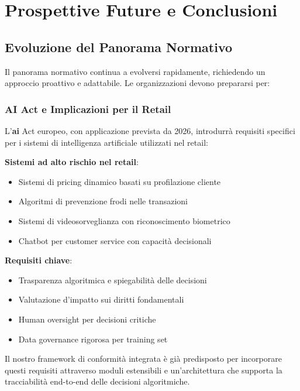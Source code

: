 \section{\texorpdfstring{Prospettive Future e Conclusioni}{4.9 - Prospettive Future e Conclusioni}}
\label{sec:4.9_conclusioni}

\subsection{\texorpdfstring{Evoluzione del Panorama Normativo}{4.9.1 - Evoluzione del Panorama Normativo}}
\label{subsec:4.9.1_evoluzione}

Il panorama normativo continua a evolversi rapidamente, richiedendo un approccio proattivo e adattabile. Le organizzazioni devono prepararsi per:

\subsubsection{\texorpdfstring{AI Act e Implicazioni per il Retail}{4.9.1.1 - AI Act e Implicazioni per il Retail}}

L'\textbf{\gls{ai}} Act europeo, con applicazione prevista da 2026, introdurrà requisiti specifici per i sistemi di intelligenza artificiale utilizzati nel retail:

\textbf{Sistemi ad alto rischio nel retail}:
\begin{itemize}
    \item Sistemi di pricing dinamico basati su profilazione cliente
    \item Algoritmi di prevenzione frodi nelle transazioni
    \item Sistemi di videosorveglianza con riconoscimento biometrico
    \item Chatbot per customer service con capacità decisionali
\end{itemize}

\textbf{Requisiti chiave}:
\begin{itemize}
    \item Trasparenza algoritmica e spiegabilità delle decisioni
    \item Valutazione d'impatto sui diritti fondamentali
    \item Human oversight per decisioni critiche
    \item Data governance rigorosa per training set
\end{itemize}

Il nostro framework di conformità integrata è già predisposto per incorporare questi requisiti attraverso moduli estensibili e un'architettura che supporta la tracciabilità end-to-end delle decisioni algoritmiche.


